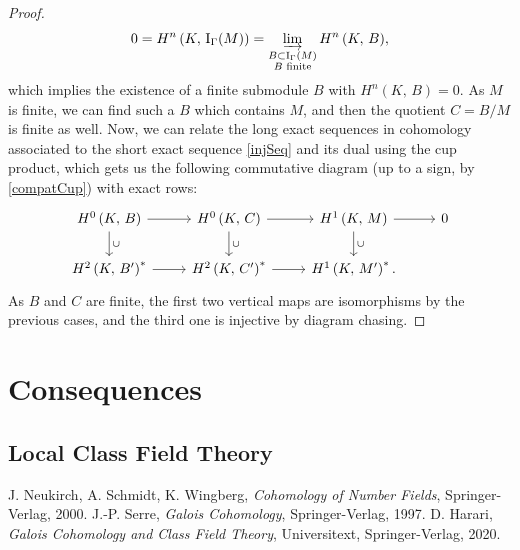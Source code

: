 \documentclass[a4paper]{article}
\def\K{K}
\renewcommand{\H}[3]{H^{#1}\left( #2, \, #3 \right)}
\newcommand{\Ind}[2]{\mathrm{I}_{#1}(#2)}
\theoremstyle{definition}
\theoremstyle{definition}
\theoremstyle{remark}
\begin{document}
\begin{proof}
    \[
        0=\H{n}{\K}{\Ind{\Gamma}{M}}=\varinjlim_{\substack{B\subset\Ind{\Gamma}{M} \\B\text{ finite}}}{\H{n}{\K}{B}},
    \]
    which implies the existence of a finite submodule \(B\) with \(\H{n}{\K}{B}=0\). As \(M\) is finite, we can find such a \(B\) which contains \(M\), and then
    the quotient \(C=B/M\) is finite as well.
    Now, we can relate the long exact sequences in cohomology associated to the short exact sequence \eqref{injSeq}
    and its dual using the cup product, which gets us the following commutative diagram (up to a sign, by \eqref{compatCup}) with exact rows:
    \[
        \begin{tikzcd}
            \H{0}{\K}{B} \ar[r] \ar[d, "\cup"] & \H{0}{\K}{C} \ar[r] \ar[d, "\cup"] & \H{1}{\K}{M} \ar[d, "\cup"] \ar[r] & 0 \\
            \H{2}{\K}{B^\prime}^* \ar[r] & \H{2}{\K}{C^\prime}^* \ar[r] & \H{1}{\K}{M^\prime}^*.
        \end{tikzcd}
    \]
    As \(B\) and \(C\) are finite, the first two vertical maps are isomorphisms by the previous cases, and the third one is injective by diagram chasing.

\end{proof}


\section{Consequences}

\subsection{Local Class Field Theory}


 J. Neukirch, A. Schmidt, K. Wingberg, \textit{Cohomology of Number Fields}, Springer-Verlag, 2000.
 J.-P. Serre, \textit{Galois Cohomology}, Springer-Verlag, 1997.
 D. Harari, \textit{Galois Cohomology and Class Field Theory}, Universitext, Springer-Verlag, 2020.
\end{document}
